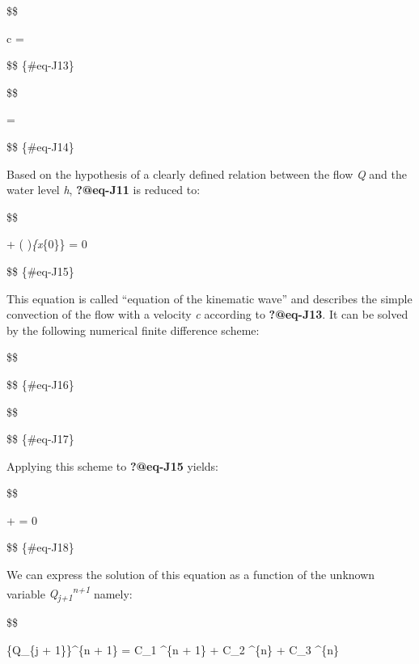 \documentclass[
  letterpaper,
  DIV=11,
  numbers=noendperiod]{scrreprt}
\begin{document}
\$\$

c =  \cdot {}

\$\$ \{\#eq-J13\}

\$\$

\delta = 

\$\$ \{\#eq-J14\}

Based on the hypothesis of a clearly defined relation between the flow
\emph{Q} and the water level \emph{h}, \textbf{?@eq-J11} is reduced to:

\$\$

 + \bigg( 
\bigg)\emph{\{x}\{0\}\} \cdot {} = 0

\$\$ \{\#eq-J15\}

This equation is called ``equation of the kinematic wave'' and describes
the simple convection of the flow with a velocity \emph{c} according to
\textbf{?@eq-J13}. It can be solved by the following numerical finite
difference scheme:

\$\$

\approx {}

\$\$ \{\#eq-J16\}

\$\$

\approx {}

\$\$ \{\#eq-J17\}

Applying this scheme to \textbf{?@eq-J15} yields:

\$\$

+
= 0

\$\$ \{\#eq-J18\}

We can express the solution of this equation as a function of the
unknown variable \emph{Q\textsubscript{j+1}\textsuperscript{n+1}}
namely:

\$\$

\{Q\_\{j + 1\}\}\^{}\{n + 1\} = C\_1 \^{}\{n + 1\} + C\_2
\^{}\{n\} + C\_3 \^{}\{n\}
\end{document}
